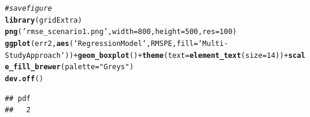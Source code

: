 \documentclass{article}\usepackage[]{graphicx}\usepackage[]{color}
\makeatletter
\newcommand{\hlnum}[1]{\textcolor[rgb]{0.686,0.059,0.569}{#1}}%
\newcommand{\hlstr}[1]{\textcolor[rgb]{0.192,0.494,0.8}{#1}}%
\newcommand{\hlcom}[1]{\textcolor[rgb]{0.678,0.584,0.686}{\textit{#1}}}%
\newcommand{\hlopt}[1]{\textcolor[rgb]{0,0,0}{#1}}%
\newcommand{\hlstd}[1]{\textcolor[rgb]{0.345,0.345,0.345}{#1}}%
\newcommand{\hlkwc}[1]{\textcolor[rgb]{0.333,0.667,0.333}{#1}}%
\newcommand{\hlkwd}[1]{\textcolor[rgb]{0.737,0.353,0.396}{\textbf{#1}}}%
\newenvironment{kframe}{%
 \def\at@end@of@kframe{}%
 \ifinner\ifhmode%
  \def\at@end@of@kframe{\end{minipage}}%
  \begin{minipage}{\columnwidth}%
 \fi\fi%
 \def\FrameCommand##1{\hskip\@totalleftmargin \hskip-\fboxsep
 \colorbox{shadecolor}{##1}\hskip-\fboxsep
     \hskip-\linewidth \hskip-\@totalleftmargin \hskip\columnwidth}%
 \MakeFramed {\advance\hsize-\width
   \@totalleftmargin\z@ \linewidth\hsize
   \@setminipage}}%
 {\par\unskip\endMakeFramed%
 \at@end@of@kframe}
\newenvironment{knitrout}{}{} %
\makeatother
\begin{document}
\begin{knitrout}
{}


\begin{kframe}\begin{alltt}
\hlcom{# save figure}
\hlkwd{library}\hlstd{(gridExtra)}
\hlkwd{png}\hlstd{(}\hlstr{'rmse_scenario1.png'}\hlstd{,} \hlkwc{width}\hlstd{=}\hlnum{800}\hlstd{,} \hlkwc{height}\hlstd{=}\hlnum{500}\hlstd{,} \hlkwc{res}\hlstd{=}\hlnum{100}\hlstd{)}
\hlkwd{ggplot}\hlstd{(err2,} \hlkwd{aes}\hlstd{(`Regression Model`, RMSPE,} \hlkwc{fill}\hlstd{=`Multi-Study Approach`))} \hlopt{+} \hlkwd{geom_boxplot}\hlstd{()} \hlopt{+} \hlkwd{theme}\hlstd{(}\hlkwc{text} \hlstd{=} \hlkwd{element_text}\hlstd{(}\hlkwc{size} \hlstd{=} \hlnum{14}\hlstd{))} \hlopt{+} \hlkwd{scale_fill_brewer}\hlstd{(}\hlkwc{palette}\hlstd{=}\hlstr{"Greys"}\hlstd{)}
\hlkwd{dev.off}\hlstd{()}
\end{alltt}
\begin{verbatim}
## pdf 
##   2
\end{verbatim}
\end{kframe}
\end{knitrout}
\end{document}
